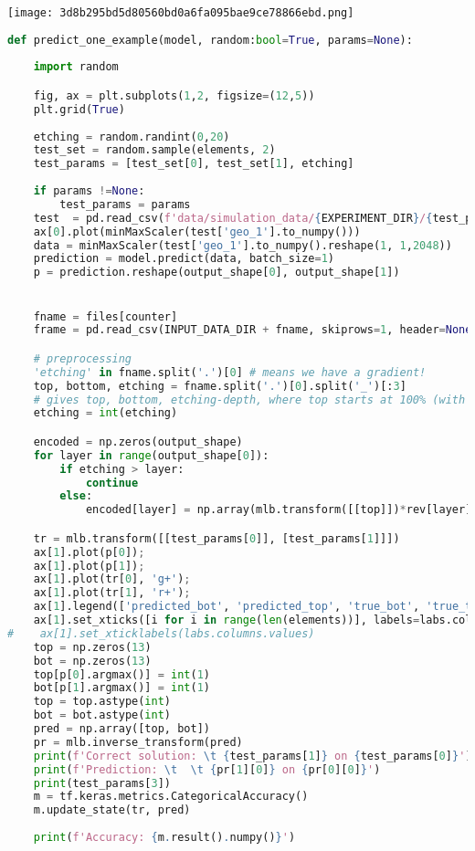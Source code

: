 \texttt{[image: 3d8b295bd5d80560bd0a6fa095bae9ce78866ebd.png]}

\begin{lstlisting}[language=Python]
def predict_one_example(model, random:bool=True, params=None):
    
    import random

    fig, ax = plt.subplots(1,2, figsize=(12,5))
    plt.grid(True)
    
    etching = random.randint(0,20)
    test_set = random.sample(elements, 2)
    test_params = [test_set[0], test_set[1], etching]
    
    if params !=None:
        test_params = params
    test  = pd.read_csv(f'data/simulation_data/{EXPERIMENT_DIR}/{test_params[0]}_{test_params[1]}_{test_params[2]}_etching_spectra.spcreg1.spc', sep='\s+')
    ax[0].plot(minMaxScaler(test['geo_1'].to_numpy()))
    data = minMaxScaler(test['geo_1'].to_numpy().reshape(1, 1,2048))
    prediction = model.predict(data, batch_size=1)
    p = prediction.reshape(output_shape[0], output_shape[1])


    fname = files[counter]
    frame = pd.read_csv(INPUT_DATA_DIR + fname, skiprows=1, header=None, sep='\s+')

    # preprocessing
    'etching' in fname.split('.')[0] # means we have a gradient!
    top, bottom, etching = fname.split('.')[0].split('_')[:3] 
    # gives top, bottom, etching-depth, where top starts at 100% (with 0 etching) on the top
    etching = int(etching)

    encoded = np.zeros(output_shape)
    for layer in range(output_shape[0]):
        if etching > layer:
            continue
        else:
            encoded[layer] = np.array(mlb.transform([[top]])*rev[layer]+mlb.transform([[bottom]])*gradient[layer])

    tr = mlb.transform([[test_params[0]], [test_params[1]]])
    ax[1].plot(p[0]);
    ax[1].plot(p[1]);
    ax[1].plot(tr[0], 'g+');
    ax[1].plot(tr[1], 'r+');
    ax[1].legend(['predicted_bot', 'predicted_top', 'true_bot', 'true_top'])
    ax[1].set_xticks([i for i in range(len(elements))], labels=labs.columns.values)
#    ax[1].set_xticklabels(labs.columns.values)
    top = np.zeros(13)
    bot = np.zeros(13)
    top[p[0].argmax()] = int(1)
    bot[p[1].argmax()] = int(1)
    top = top.astype(int)
    bot = bot.astype(int)
    pred = np.array([top, bot])
    pr = mlb.inverse_transform(pred)
    print(f'Correct solution: \t {test_params[1]} on {test_params[0]}')
    print(f'Prediction: \t  \t {pr[1][0]} on {pr[0][0]}')
    print(test_params[3])
    m = tf.keras.metrics.CategoricalAccuracy()
    m.update_state(tr, pred)
    
    print(f'Accuracy: {m.result().numpy()}')
\end{lstlisting}

